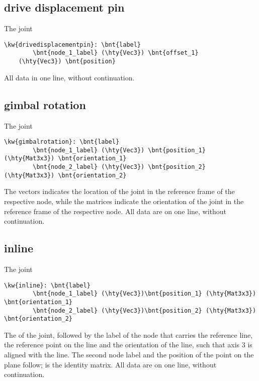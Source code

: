 \subsection{drive displacement pin}
The  joint
\begin{Verbatim}[commandchars=\\\{\}]
    \kw{drivedisplacementpin}: \bnt{label}
        \bnt{node_1_label} (\hty{Vec3}) \bnt{offset_1}
	(\hty{Vec3}) \bnt{position}
\end{Verbatim}
All data in one line, without continuation.

\subsection{gimbal rotation}
The  joint
\begin{Verbatim}[commandchars=\\\{\}]
    \kw{gimbalrotation}: \bnt{label}
        \bnt{node_1_label} (\hty{Vec3}) \bnt{position_1} (\hty{Mat3x3}) \bnt{orientation_1}
        \bnt{node_2_label} (\hty{Vec3}) \bnt{position_2} (\hty{Mat3x3}) \bnt{orientation_2}
\end{Verbatim}
The  vectors indicates the location of the joint
in the reference frame of the respective node,
while the  matrices indicate the orientation of the joint
in the reference frame of the respective node.
All data are on one line, without continuation.

\subsection{inline}
The  joint
\begin{Verbatim}[commandchars=\\\{\}]
    \kw{inline}: \bnt{label}
        \bnt{node_1_label} (\hty{Vec3})\bnt{position_1} (\hty{Mat3x3}) \bnt{orientation_1}
        \bnt{node_2_label} (\hty{Vec3})\bnt{position_2} (\hty{Mat3x3}) \bnt{orientation_2}
\end{Verbatim}
The  of the joint, followed by the label of the node
that carries the reference line, the reference point 
on the line and the orientation  of the line,
such that axis 3 is aligned with the line.
The second node label and the position of the point on the plane
follow;  is the identity matrix.
All data are on one line, without continuation.

